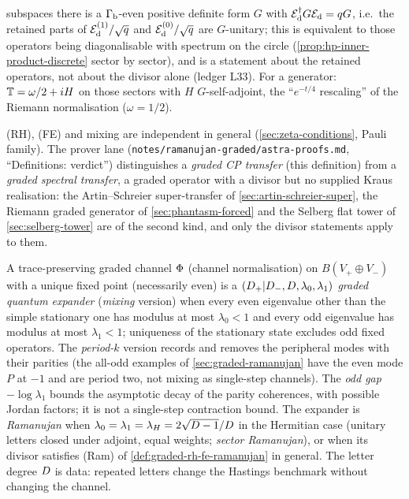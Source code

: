 \begin{definition}
\begin{enumerate}
subspaces there is a $\Gamma_{\mathrm b}$-even positive definite form $G$ with $\mathcal E_{\mathrm d}^\dagger G\mathcal E_{\mathrm d} = q G$,
i.e.\ the retained parts of ${\mathcal E_{\mathrm d}^{(1)}}/\sqrt{q}$ and ${\mathcal E_{\mathrm d}^{(0)}}/\sqrt{q}$ are $G$-unitary; this is
equivalent to those operators being diagonalisable with spectrum on the circle
(\cref{prop:hp-inner-product-discrete} sector by sector), and is a statement about the retained
operators, not about the divisor alone (ledger L33). For a generator: $\mathbb T = \omega/2 + iH$ on those sectors
with $H$ $G$-self-adjoint, the ``$e^{-t/4}$ rescaling'' of the Riemann normalisation
($\omega = 1/2$).
\end{enumerate}
(RH), (FE) and mixing are independent in general (\cref{sec:zeta-conditions}, Pauli family).
The prover lane (\texttt{notes/ramanujan-graded/astra-proofs.md}, ``Definitions: verdict'')
distinguishes a \emph{graded CP transfer} (this definition) from a \emph{graded spectral transfer},
a graded operator with a divisor but no supplied Kraus realisation: the Artin--Schreier
super-transfer of \cref{sec:artin-schreier-super}, the Riemann graded generator of
\cref{sec:phantasm-forced} and the Selberg flat tower of \cref{sec:selberg-tower} are of the
second kind, and only the divisor statements apply to them.
\end{definition}

\begin{definition}
\label{def:graded-quantum-expander}
A trace-preserving graded channel $\Phi$ (channel normalisation) on $B(V_+\oplus V_-)$ with a
unique fixed point (necessarily even) is a \emph{$(D_+|D_-,D,\lambda_0,\lambda_1)$ graded quantum
expander} (\emph{mixing} version) when every even eigenvalue other than the simple stationary
one has modulus at most $\lambda_0<1$ and every odd eigenvalue has modulus at most $\lambda_1<1$;
uniqueness of the stationary state excludes odd fixed operators. The \emph{period-$k$} version
records and removes the peripheral modes with their parities (the all-odd examples of
\cref{sec:graded-ramanujan} have the even mode $P$ at $-1$ and are period two, not mixing as
single-step channels). The \emph{odd gap} $-\log\lambda_1$ bounds the asymptotic decay of the
parity coherences, with possible Jordan factors; it is not a single-step contraction bound. The expander is \emph{Ramanujan} when $\lambda_0 =
\lambda_1 = \lambda_H = 2\sqrt{D-1}/D$ in the Hermitian case (unitary letters closed under adjoint,
equal weights; \emph{sector Ramanujan}), or when its divisor satisfies (Ram) of
\cref{def:graded-rh-fe-ramanujan} in general. The letter degree $D$ is data: repeated letters
change the Hastings benchmark without changing the channel.
\end{definition}


